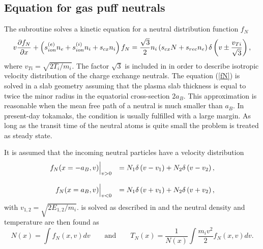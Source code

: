 \subsection{Equation for gas puff neutrals} 

The subroutine solves a kinetic equation for a neutral distribution
function $f_N$ 
\begin{equation}\label{fN}
v\prti{f_N}{x}+\lb(s_{ion}^{(e)}n_e+s_{ion}^{(i)}n_i+s_{cx}n_i\rb)f_N
=\frac{\sqrt{3}}{2}n_i\lb(s_{cx}N+s_{rec}n_e\rb)
\delta\lb(v\pm\frac{v_{Ti}}{\sqrt{3}}\rb)
,%
\end{equation}
where $v_{Ti}=\sqrt{2T_i/m_i}.$
The factor $\sqrt{3}$ is included in  in order to describe
isotropic velocity distribution of the charge exchange neutrals.
The equation (\ref{fN}) is solved in a slab geometry assuming that the
plasma slab thickness is equal to twice the  minor radius in the
equatorial cross-section $2a_B$. 
This approximation is reasonable when the mean free path of a neutral is
much smaller than $a_B$. 
In present-day tokamaks, the condition is usually fulfilled with a large
margin. 
As long as the transit time of the neutral atoms is quite small the
problem is treated as steady state.

It is assumed that the incoming neutral particles have a
velocity distribution 
\begin{equation}\label{fN0}
\begin{array}{rl}\dstyle
\Bigl.f_N(x=-a_B,v)\Bigr|_{v>0}
&\dstyle
=N_1\delta\lb(v-v_1\rb)
+N_2\delta\lb(v-v_2\rb)
,\bigskip\\ \dstyle
\Bigl.f_N(x=a_B,v)\Bigr|_{v<0}
&\dstyle
=N_1\delta\lb(v+v_1\rb)
+N_2\delta\lb(v+v_2\rb)
,\end{array}
\end{equation}
with $v_{1,2}=\sqrt{2E_{1,2}/m_i}.$
 is solved as described in \cite{DK} and the neutral density and
temperature are then found as 
\begin{equation}\label{N}
N(x)=\int f_N(x,v)dv
\qquad\mbox{and}\qquad
T_N(x)=\frac{1}{N(x)}\int \frac{m_iv^2}{2}f_N(x,v)dv
.\end{equation}

